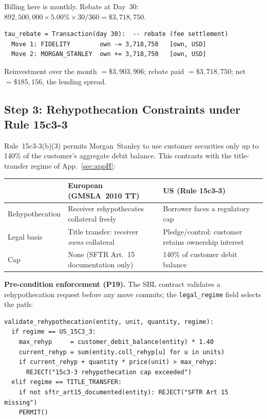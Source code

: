 \noindent Billing here is monthly. Rebate at Day~30: $892{,}500{,}000 \times 5.00\% \times 30/360 = \$3{,}718{,}750$.

\begin{lstlisting}
tau_rebate = Transaction(day 30):  -- rebate (fee settlement)
  Move 1: FIDELITY        own -= 3,718,750   [own, USD]
  Move 2: MORGAN_STANLEY  own += 3,718,750   [own, USD]
\end{lstlisting}

\noindent Reinvestment over the month $= \$3{,}903{,}906$; rebate paid $= \$3{,}718{,}750$; net $= \$185{,}156$, the lending spread.

\subsection{Step 3: Rehypothecation Constraints under Rule 15c3-3}
\label{sec:us-step3}

Rule~15c3-3(b)(3) permits Morgan~Stanley to use customer securities only up to 140\% of the customer's aggregate debit balance. This contrasts with the title-transfer regime of App.~\ref{sec:appH}:

\begin{center}\small
\begin{tabular}{l p{5cm} p{5cm}}
\toprule
& \textbf{European (GMSLA~2010 TT)} & \textbf{US (Rule 15c3-3)} \\
\midrule
Rehypothecation & Receiver rehypothecates collateral freely & Borrower faces a regulatory cap \\
Legal basis & Title transfer: receiver \emph{owns} collateral & Pledge/control: customer retains ownership interest \\
Cap & None (SFTR Art.~15 documentation only) & 140\% of customer debit balance \\
\bottomrule
\end{tabular}
\end{center}

\noindent\textbf{Pre-condition enforcement (P19).} The SBL contract validates a rehypothecation request before any move commits; the \texttt{legal\_regime} field selects the path:

\begin{lstlisting}
validate_rehypothecation(entity, unit, quantity, regime):
  if regime == US_15C3_3:
    max_rehyp     = customer_debit_balance(entity) * 1.40
    current_rehyp = sum(entity.coll_rehyp[u] for u in units)
    if current_rehyp + quantity * price(unit) > max_rehyp:
      REJECT("15c3-3 rehypothecation cap exceeded")
  elif regime == TITLE_TRANSFER:
    if not sftr_art15_documented(entity): REJECT("SFTR Art 15 missing")
    PERMIT()
\end{lstlisting}

